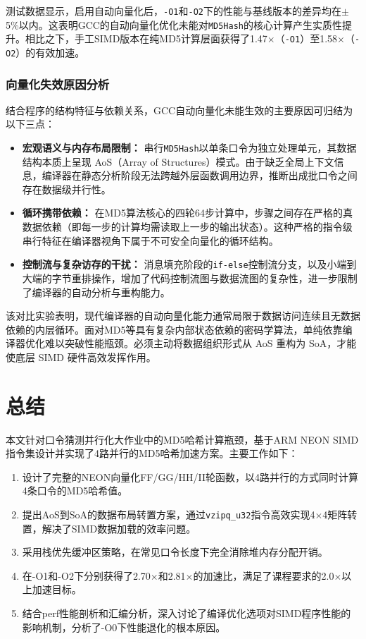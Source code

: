 \documentclass[UTF8,a4paper,10pt]{ctexart}
\begin{document}
测试数据显示，启用自动向量化后，\lstinline{-O1}和\lstinline{-O2}下的性能与基线版本的差异均在$\pm$5\%以内。这表明GCC的自动向量化优化未能对\lstinline{MD5Hash}的核心计算产生实质性提升。相比之下，手工SIMD版本在纯MD5计算层面获得了1.47$\times$（\lstinline{-O1}）至1.58$\times$（\lstinline{-O2}）的有效加速。

\subsubsection{向量化失效原因分析}

结合程序的结构特征与依赖关系，GCC自动向量化未能生效的主要原因可归结为以下三点：

\begin{itemize}
  \item \textbf{宏观语义与内存布局限制：} 串行\lstinline{MD5Hash}以单条口令为独立处理单元，其数据结构本质上呈现 AoS（Array of Structures）模式。由于缺乏全局上下文信息，编译器在静态分析阶段无法跨越外层函数调用边界，推断出成批口令之间存在数据级并行性。
  \item \textbf{循环携带依赖：} 在MD5算法核心的四轮64步计算中，步骤之间存在严格的真数据依赖（即每一步的计算均需读取上一步的输出状态）。这种严格的指令级串行特征在编译器视角下属于不可安全向量化的循环结构。
  \item \textbf{控制流与复杂访存的干扰：} 消息填充阶段的\lstinline{if-else}控制流分支，以及小端到大端的字节重排操作，增加了代码控制流图与数据流图的复杂性，进一步限制了编译器的自动分析与重构能力。
\end{itemize}

该对比实验表明，现代编译器的自动向量化能力通常局限于数据访问连续且无数据依赖的内层循环。面对MD5等具有复杂内部状态依赖的密码学算法，单纯依靠编译器优化难以突破性能瓶颈。必须主动将数据组织形式从 AoS 重构为 SoA，才能使底层 SIMD 硬件高效发挥作用。

\section{总结}

本文针对口令猜测并行化大作业中的MD5哈希计算瓶颈，基于ARM NEON SIMD指令集设计并实现了4路并行的MD5哈希加速方案。主要工作如下：

\begin{enumerate}
  \item 设计了完整的NEON向量化FF/GG/HH/II轮函数，以4路并行的方式同时计算4条口令的MD5哈希值。
  \item 提出AoS到SoA的数据布局转置方案，通过\lstinline{vzipq_u32}指令高效实现4$\times$4矩阵转置，解决了SIMD数据加载的效率问题。
  \item 采用栈优先缓冲区策略，在常见口令长度下完全消除堆内存分配开销。
  \item 在-O1和-O2下分别获得了2.70$\times$和2.81$\times$的加速比，满足了课程要求的2.0$\times$以上加速目标。
  \item 结合perf性能剖析和汇编分析，深入讨论了编译优化选项对SIMD程序性能的影响机制，分析了-O0下性能退化的根本原因。
\end{enumerate}
\end{document}
